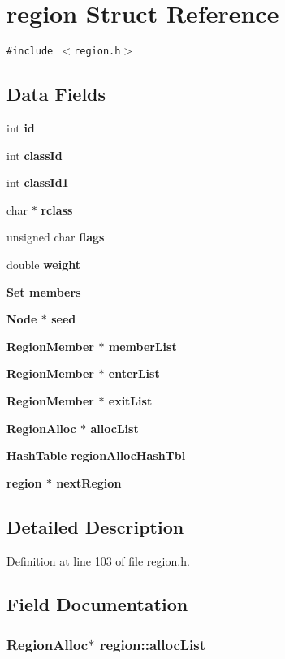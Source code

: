\section{region Struct Reference}
\label{structregion}
{\tt \#include $<$region.h$>$}

\subsection*{Data Fields}
\begin{CompactItemize}
\item 
int \bf{id}
\item 
int \bf{class\-Id}
\item 
int \bf{class\-Id1}
\item 
char $\ast$ \bf{rclass}
\item 
unsigned char \bf{flags}
\item 
double \bf{weight}
\item 
\bf{Set} \bf{members}
\item 
\bf{Node} $\ast$ \bf{seed}
\item 
\bf{Region\-Member} $\ast$ \bf{member\-List}
\item 
\bf{Region\-Member} $\ast$ \bf{enter\-List}
\item 
\bf{Region\-Member} $\ast$ \bf{exit\-List}
\item 
\bf{Region\-Alloc} $\ast$ \bf{alloc\-List}
\item 
\bf{Hash\-Table} \bf{region\-Alloc\-Hash\-Tbl}
\item 
\bf{region} $\ast$ \bf{next\-Region}
\end{CompactItemize}


\subsection{Detailed Description}




Definition at line 103 of file region.h.

\subsection{Field Documentation}
\subsubsection{\setlength{\rightskip}{0pt plus 5cm}\bf{Region\-Alloc}$\ast$ \bf{region::alloc\-List}}\label{structregion_c968928c72440bc79b423ced4f2f7c54}




